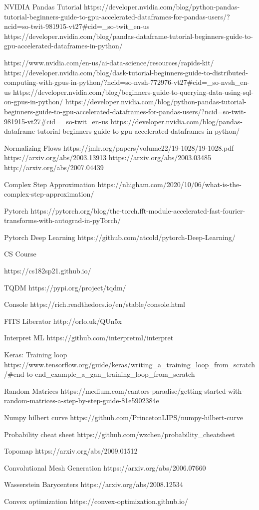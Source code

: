 NVIDIA Pandas Tutorial
https://developer.nvidia.com/blog/python-pandas-tutorial-beginners-guide-to-gpu-accelerated-dataframes-for-pandas-users/?ncid=so-twit-981915-vt27#cid=_so-twit_en-us
https://developer.nvidia.com/blog/pandas-dataframe-tutorial-beginners-guide-to-gpu-accelerated-dataframes-in-python/


https://www.nvidia.com/en-us/ai-data-science/resources/rapids-kit/
https://developer.nvidia.com/blog/dask-tutorial-beginners-guide-to-distributed-computing-with-gpus-in-python/?ncid=so-nvsh-772976-vt27#cid=_so-nvsh_en-us
https://developer.nvidia.com/blog/beginners-guide-to-querying-data-using-sql-on-gpus-in-python/
https://developer.nvidia.com/blog/python-pandas-tutorial-beginners-guide-to-gpu-accelerated-dataframes-for-pandas-users/?ncid=so-twit-981915-vt27#cid=_so-twit_en-us
https://developer.nvidia.com/blog/pandas-dataframe-tutorial-beginners-guide-to-gpu-accelerated-dataframes-in-python/


Normalizing Flows
https://jmlr.org/papers/volume22/19-1028/19-1028.pdf
https://arxiv.org/abs/2003.13913
https://arxiv.org/abs/2003.03485
http://arxiv.org/abs/2007.04439

Complex Step Approximation
https://nhigham.com/2020/10/06/what-is-the-complex-step-approximation/


Pytorch
https://pytorch.org/blog/the-torch.fft-module-accelerated-fast-fourier-transforms-with-autograd-in-pyTorch/

Pytorch Deep Learning
https://github.com/atcold/pytorch-Deep-Learning/

CS Course

https://cs182sp21.github.io/

TQDM
https://pypi.org/project/tqdm/

Console
https://rich.readthedocs.io/en/stable/console.html

FITS Liberator
http://orlo.uk/QUn5x

Interpret ML
https://github.com/interpretml/interpret

Keras: Training loop
https://www.tensorflow.org/guide/keras/writing_a_training_loop_from_scratch/#end-to-end_example_a_gan_training_loop_from_scratch


Random Matrices
https://medium.com/cantors-paradise/getting-started-with-random-matrices-a-step-by-step-guide-81e5902384e


Numpy hilbert curve
https://github.com/PrincetonLIPS/numpy-hilbert-curve

Probability cheat sheet
https://github.com/wzchen/probability_cheatsheet

Topomap
https://arxiv.org/abs/2009.01512

Convolutional Mesh Generation
https://arxiv.org/abs/2006.07660




Wasserstein Barycenters
https://arxiv.org/abs/2008.12534

Convex optimization
https://convex-optimization.github.io/

